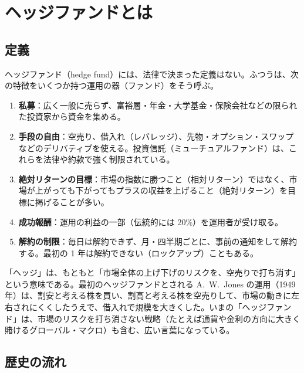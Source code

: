 \chapter{ヘッジファンドとは}
\label{ch:hf}

\section{定義}

ヘッジファンド（hedge fund）には、法律で決まった定義はない。ふつうは、次の特徴をいくつか持つ運用の器（ファンド）をそう呼ぶ。

\begin{defbox}[ヘッジファンドの典型的な特徴]
\begin{enumerate}
\item \textbf{私募}：広く一般に売らず、富裕層・年金・大学基金・保険会社などの限られた投資家から資金を集める。
\item \textbf{手段の自由}：空売り、借入れ（レバレッジ）、先物・オプション・スワップなどのデリバティブを使える。投資信託（ミューチュアルファンド）は、これらを法律や約款で強く制限されている。
\item \textbf{絶対リターンの目標}：市場の指数に勝つこと（相対リターン）ではなく、市場が上がっても下がってもプラスの収益を上げること（絶対リターン）を目標に掲げることが多い。
\item \textbf{成功報酬}：運用の利益の一部（伝統的には 20\%）を運用者が受け取る。
\item \textbf{解約の制限}：毎日は解約できず、月・四半期ごとに、事前の通知をして解約する。最初の 1 年は解約できない（ロックアップ）こともある。
\end{enumerate}
\end{defbox}

「ヘッジ」は、もともと「市場全体の上げ下げのリスクを、空売りで打ち消す」という意味である。最初のヘッジファンドとされる A.~W.~Jones の運用（1949 年）は、割安と考える株を買い、割高と考える株を空売りして、市場の動きに左右されにくくしたうえで、借入れで規模を大きくした。いまの「ヘッジファンド」は、市場のリスクを打ち消さない戦略（たとえば通貨や金利の方向に大きく賭けるグローバル・マクロ）も含む、広い言葉になっている。

\section{歴史の流れ}

